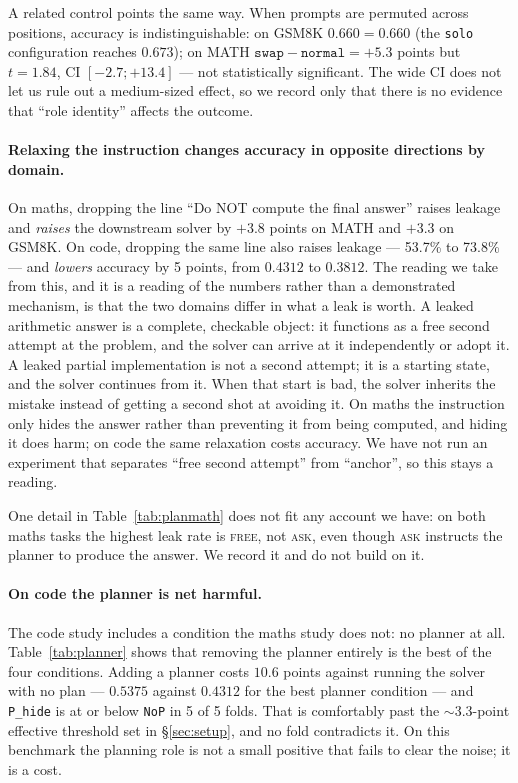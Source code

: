 \documentclass[11pt,a4paper]{article}
\begin{document}
A related control points the same way. When prompts are permuted across positions, accuracy is indistinguishable: on GSM8K $0.660 = 0.660$ (the \texttt{solo} configuration reaches $0.673$); on MATH $\texttt{swap}-\texttt{normal} = +5.3$ points but $t=1.84$, CI $[-2.7;+13.4]$ --- not statistically significant. The wide CI does not let us rule out a medium-sized effect, so we record only that there is no evidence that ``role identity'' affects the outcome.

\paragraph{Relaxing the instruction changes accuracy in opposite directions by domain.} On maths, dropping the line ``Do NOT compute the final answer'' raises leakage and \emph{raises} the downstream solver by $+3.8$ points on MATH and $+3.3$ on GSM8K. On code, dropping the same line also raises leakage --- 53.7\% to 73.8\% --- and \emph{lowers} accuracy by 5 points, from $0.4312$ to $0.3812$. The reading we take from this, and it is a reading of the numbers rather than a demonstrated mechanism, is that the two domains differ in what a leak is worth. A leaked arithmetic answer is a complete, checkable object: it functions as a free second attempt at the problem, and the solver can arrive at it independently or adopt it. A leaked partial implementation is not a second attempt; it is a starting state, and the solver continues from it. When that start is bad, the solver inherits the mistake instead of getting a second shot at avoiding it. On maths the instruction only hides the answer rather than preventing it from being computed, and hiding it does harm; on code the same relaxation costs accuracy. We have not run an experiment that separates ``free second attempt'' from ``anchor'', so this stays a reading.

One detail in Table~\ref{tab:planmath} does not fit any account we have: on both maths tasks the highest leak rate is \textsc{free}, not \textsc{ask}, even though \textsc{ask} instructs the planner to produce the answer. We record it and do not build on it.

\paragraph{On code the planner is net harmful.} The code study includes a condition the maths study does not: no planner at all. Table~\ref{tab:planner} shows that removing the planner entirely is the best of the four conditions. Adding a planner costs $10.6$ points against running the solver with no plan --- $0.5375$ against $0.4312$ for the best planner condition --- and \texttt{P\_hide} is at or below \texttt{NoP} in 5 of 5 folds. That is comfortably past the $\sim$3.3-point effective threshold set in \S\ref{sec:setup}, and no fold contradicts it. On this benchmark the planning role is not a small positive that fails to clear the noise; it is a cost.
\end{document}
